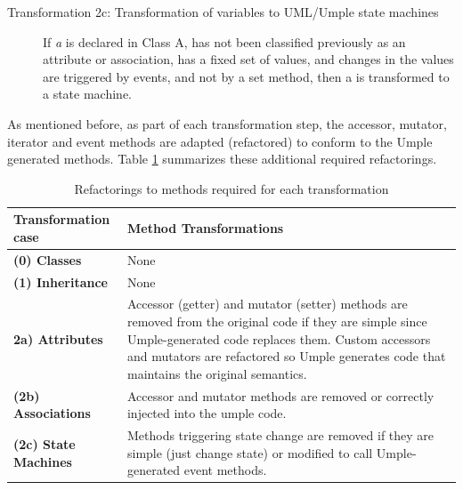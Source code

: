 \begin{description}
\begin{description}
	\item [Transformation 2c: Transformation of variables to UML/Umple state machines]
	If \textit{a} is declared in Class A, has not been classified previously as an attribute or association, has a fixed set of values, and changes in the values are triggered by events, and not by a set method, then a is transformed to a state machine.	

	\end{description}
\end{description}

As mentioned before, as part of each transformation step, the accessor, mutator, iterator and event methods are adapted (refactored) to conform to the Umple generated methods. Table \ref{table:transformations} summarizes these additional required refactorings. 

\begin{table}[htbp]
	\caption{Refactorings to methods required for each transformation}
	\label{table:transformations}
    \centering
    \begin{tabularx}{\textwidth}{| X | X |}
        \toprule
        \rowcolor[HTML]{BBDAFF}
       \textbf{ Transformation case  }   & \textbf{Method Transformations}
        \\ \hline
        \textbf{(0)  Classes }        & None      \\ \hline
        \textbf{(1)  Inheritance}     & None       \\ \hline
        \textbf{2a)  Attributes}      & 
        Accessor (getter) and mutator (setter) methods are removed from the original code if they are simple since 		Umple-generated code replaces them. Custom accessors and mutators are refactored so Umple generates code 			that maintains the original
        semantics.         		\\ \hline
        \textbf{(2b) Associations }   & 
 		Accessor and mutator methods are removed or correctly injected into the umple code.        
		\\ \hline
        \textbf{(2c) State Machines  }  & 
		Methods triggering state change are removed if they are simple (just change state) or modified to call 				Umple-generated event methods.  	
		\\ \hline
    \end{tabularx}
\end{table}


